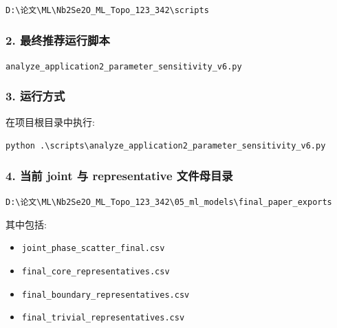 \documentclass[lang=cn,scheme=chinese,color=blue,device=normal,toc=onecol,math=cm]{elegantbook}
\begin{document}
\texttt{D:\textbackslash{}\allowbreak{}论文\textbackslash{}\allowbreak{}ML\textbackslash{}\allowbreak{}Nb2Se2O\_\allowbreak{}ML\_\allowbreak{}Topo\_\allowbreak{}123\_\allowbreak{}342\textbackslash{}\allowbreak{}scripts}\par


\subsubsection{2. 最终推荐运行脚本}


\texttt{analyze\_\allowbreak{}application2\_\allowbreak{}parameter\_\allowbreak{}sensitivity\_\allowbreak{}v6.py}\par


\subsubsection{3. 运行方式}


在项目根目录中执行:\par


\texttt{python .\textbackslash{}\allowbreak{}scripts\textbackslash{}\allowbreak{}analyze\_\allowbreak{}application2\_\allowbreak{}parameter\_\allowbreak{}sensitivity\_\allowbreak{}v6.py}\par


\subsubsection{4. 当前 joint 与 representative 文件母目录}


\texttt{D:\textbackslash{}\allowbreak{}论文\textbackslash{}\allowbreak{}ML\textbackslash{}\allowbreak{}Nb2Se2O\_\allowbreak{}ML\_\allowbreak{}Topo\_\allowbreak{}123\_\allowbreak{}342\textbackslash{}\allowbreak{}05\_\allowbreak{}ml\_\allowbreak{}models\textbackslash{}\allowbreak{}final\_\allowbreak{}paper\_\allowbreak{}exports}\par


其中包括:\par


\begin{itemize}
\item \texttt{joint\_\allowbreak{}phase\_\allowbreak{}scatter\_\allowbreak{}final.csv}
\item \texttt{final\_\allowbreak{}core\_\allowbreak{}representatives.csv}
\item \texttt{final\_\allowbreak{}boundary\_\allowbreak{}representatives.csv}
\item \texttt{final\_\allowbreak{}trivial\_\allowbreak{}representatives.csv}
\end{itemize}
\end{document}
